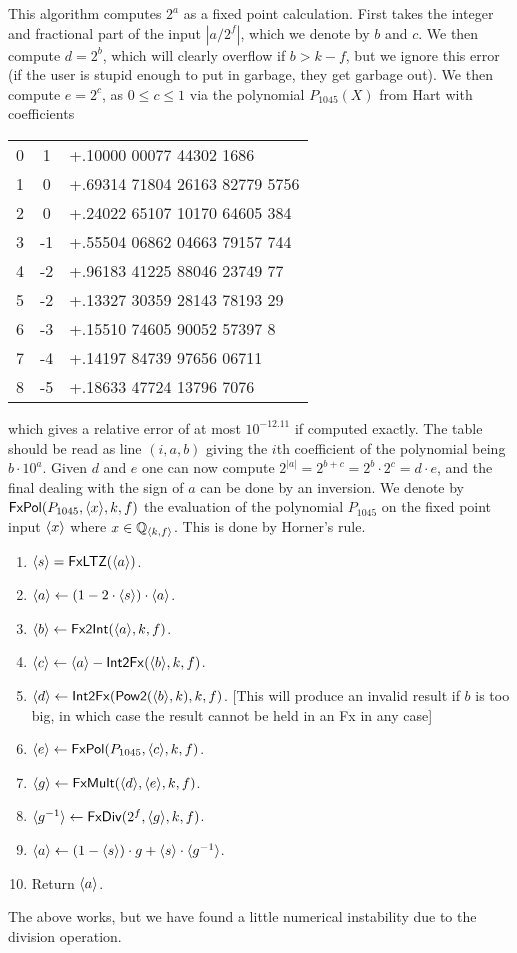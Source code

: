 This algorithm computes $2^a$ as a fixed point calculation.
First takes the integer and fractional part of the input
$|a/2^f|$, which we denote by $b$ and $c$.
We then compute $d=2^b$, which will clearly overflow
if $b>k-f$, but we ignore this error (if the user is stupid
enough to put in garbage, they get garbage out).
We then compute $e=2^c$, as $0 \le c \le 1$ via the 
polynomial $P_{1045}(X)$ from Hart \cite{Hart:1978:CA:540084} with coefficients
\begin{center}
\begin{tabular}{|c|c|l|}
\hline
0 & 1  & +.10000 00077 44302 1686 \\
1 & 0  & +.69314 71804 26163 82779 5756 \\
2 & 0  & +.24022 65107 10170 64605 384 \\
3 & -1 & +.55504 06862 04663 79157 744 \\
4 & -2 & +.96183 41225 88046 23749 77 \\
5 & -2 & +.13327 30359 28143 78193 29 \\
6 & -3 & +.15510 74605 90052 57397 8 \\
7 & -4 & +.14197 84739 97656 06711 \\
8 & -5 & +.18633 47724 13796 7076 \\
\hline
\end{tabular}
\end{center}
which gives a relative error of at most $10^{-12.11}$
if computed exactly.
The table should be read as line $(i,a,b)$ giving 
the $i$th coefficient of the polynomial being
$b \cdot 10^a$.
Given $d$ and $e$ one can now compute
$2^{|a|}=2^{b+c}=2^b \cdot 2^c=d \cdot e$,
and the final dealing with the sign of $a$ can
be done by an inversion.
We denote by $\mathsf{FxPol}(P_{1045},\langle x \rangle,k,f)$ the evaluation
of the polynomial $P_{1045}$ on the fixed point input $\langle x \rangle$
where $x \in {\mathbb{Q}}_{\langle k, f \rangle}$. This is done by Horner's rule.
\begin{enumerate}
\item $\langle s \rangle=\mathsf{FxLTZ}(\langle a \rangle)$.
\item $\langle a \rangle \leftarrow (1-2 \cdot \langle s \rangle) \cdot \langle a \rangle$.
\item $\langle b \rangle \leftarrow \mathsf{Fx2Int}(\langle a \rangle,k,f)$.
\item $\langle c \rangle \leftarrow \langle a \rangle-\mathsf{Int2Fx}(\langle b \rangle,k,f)$.
\item $\langle d \rangle \leftarrow \mathsf{Int2Fx}(\mathsf{Pow2}(\langle b \rangle,k),k,f)$. [This will produce an invalid result if $b$ is too big, in which case the result cannot be held in an Fx in any case]
\item $\langle e \rangle \leftarrow \mathsf{FxPol}(P_{1045},\langle c \rangle,k,f)$.
\item $\langle g \rangle \leftarrow \mathsf{FxMult}(\langle d \rangle,\langle e \rangle,k,f)$.
\item $\langle g^{-1} \rangle \leftarrow \mathsf{FxDiv}(2^f,\langle g \rangle,k,f)$.
\item $\langle a \rangle \leftarrow (1-\langle s \rangle) \cdot g+ \langle s \rangle \cdot \langle g^{-1} \rangle$.
\item Return $\langle a \rangle$.
\end{enumerate}
The above works, but we have found a little numerical
instability due to the division operation. 
